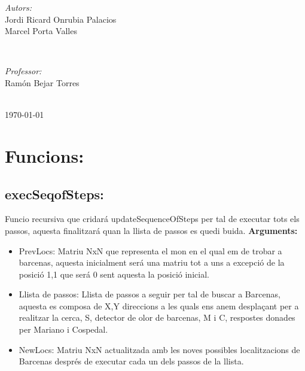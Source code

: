 \documentclass[11pt]{article}
\begin{document}
\begin{titlepage}
		\begin{minipage}{0.4\textwidth}
			\begin{flushleft} \large
				\emph{Autors:}\\
				Jordi Ricard Onrubia Palacios\\
				Marcel Porta Valles
			\end{flushleft}
		\end{minipage}
		~
		\begin{minipage}{0.4\textwidth}
			\begin{flushright} \large
				\emph{Professor:} \\
				Ramón Bejar Torres
			\end{flushright}
		\end{minipage}\\[4cm]
		
		{\large \today}\\[3cm] %
		\vfill %
	\end{titlepage}
\newpage
\thispagestyle{empty}
\newpage
\tableofcontents
\listoffigures
\newpage
\clearpage
{}
\section{Funcions:}
\subsection{execSeqofSteps:}
Funcio recursiva que cridará updateSequenceOfSteps per tal de executar tots els passos, aquesta finalitzará quan la llista de passos es quedi buida.
\textbf{Arguments:}
\begin{itemize}
\item PrevLocs: Matriu NxN que representa el mon en el qual em de trobar a barcenas, aquesta inicialment será una matriu tot a uns a excepció de la posició 1,1 que será 0 sent aquesta la posició inicial.
\item Llista de passos: Llista de passos a seguir per tal de buscar a Barcenas, aquesta es composa de X,Y direccions a les quals ens anem desplaçant per a realitzar la cerca, S, detector de olor de barcenas, M i C, respostes donades per Mariano i Cospedal.
\item NewLocs: Matriu NxN actualitzada amb les noves possibles localitzacions de Barcenas després de executar cada un dels passos de la llista.
\end{itemize}
\end{document}
